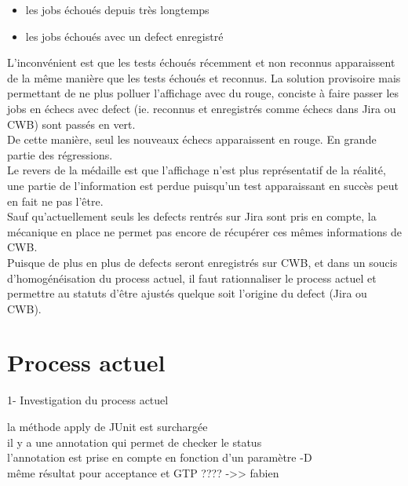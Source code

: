 \begin{itemize}
	\item les jobs échoués depuis très longtemps
	\item les jobs échoués avec un defect enregistré
\end{itemize}
L'inconvénient est que les tests échoués récemment et non reconnus apparaissent de la même manière que les tests échoués et reconnus. La solution provisoire mais permettant de ne plus polluer l'affichage avec du rouge, conciste à faire passer les jobs en échecs avec defect (ie. reconnus et enregistrés comme échecs dans Jira ou CWB) sont passés en vert.\\
De cette manière, seul les nouveaux échecs apparaissent en rouge. En grande partie des régressions.\\
Le revers de la médaille est que l'affichage n'est plus représentatif de la réalité, une partie de l'information est perdue puisqu'un test apparaissant en succès peut en fait ne pas l'être.\\




Sauf qu'actuellement seuls les defects rentrés sur Jira sont pris en compte, la mécanique en place ne permet pas encore de récupérer ces mêmes informations de CWB. \\
Puisque de plus en plus de defects seront enregistrés sur CWB, et dans un soucis d'homogénéisation du process actuel, il faut rationnaliser le process actuel et permettre au statuts d'être ajustés quelque soit l'origine du defect (Jira ou CWB).\\




\section{Process actuel}

1- Investigation du process actuel

la méthode apply de JUnit est surchargée\\
il y a une annotation qui permet de checker le status\\
l'annotation est prise en compte en fonction d'un paramètre -D\\

même résultat pour acceptance et GTP ????   ->> fabien\\

